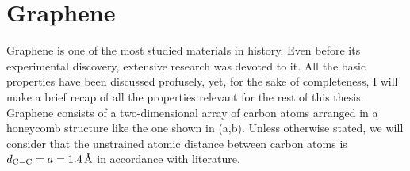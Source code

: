 \chapter{Graphene}
\label{ch:graphene}

%
%

Graphene is one of the most studied materials in history\cite{KatsnelsonBook, Geim2007, Murakami2009, CastroNeto2009a, Mas-Balleste2011, Konschuh2011a, Cooper2012, Han2014, Sadurni2014, Rozhkov2016}.
Even before its experimental discovery\cite{Novoselov2004, Novoselov2005}, extensive research was devoted to it\cite{Wallace1947, VanBommel1975, Semenoff1984, Haldane1988, Forbeaux1998, Oshima2000}.
All the basic properties have been discussed profusely, yet, for the sake of completeness, I will make a brief recap of all the properties relevant for the rest of this thesis.\\

% 

Graphene consists of a two-dimensional array of carbon atoms arranged in a honeycomb structure\cite{Huang2011} %
like the one shown in (a,b).
Unless otherwise stated, we will consider that the unstrained atomic distance between carbon atoms is $d_{\ce{C}-\ce{C}}=a=\SI{1.4}{\angstrom}$ in accordance with literature\cite{KatsnelsonBook, Cooper2012, Ishigami2007}. %

